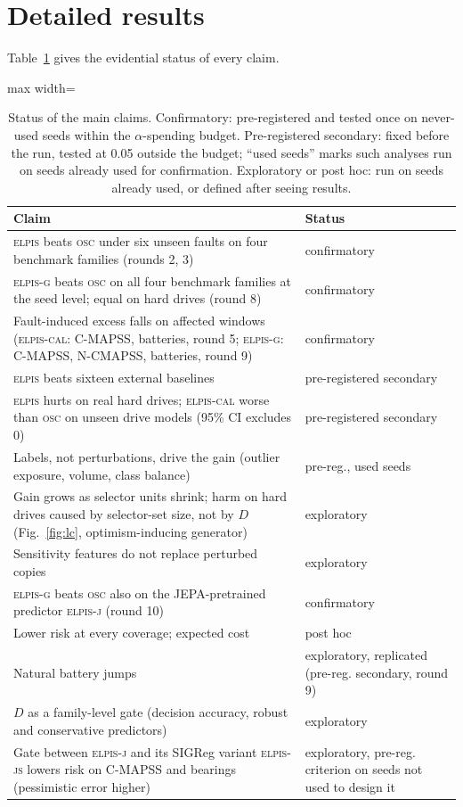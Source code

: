\documentclass{esannV2}
\newcommand{\OSC}{\textsc{osc}}
\newcommand{\RPT}{\textsc{elpis}}
\newcommand{\AUTO}{\textsc{elpis-cal}}
\newcommand{\AUTOD}{\textsc{elpis-g}}
\newcommand{\EJ}{\textsc{elpis-j}}
\newcommand{\EJS}{\textsc{elpis-js}}
\begin{document}
\section{Detailed results}\label{app:detail}
Table~\ref{tab:claims} gives the evidential status of every claim.
\begin{table}[!htbp]
\caption{Status of the main claims. Confirmatory: pre-registered and tested once on never-used seeds within the $\alpha$-spending budget. Pre-registered secondary: fixed before the run, tested at 0.05 outside the budget; ``used seeds'' marks such analyses run on seeds already used for confirmation. Exploratory or post hoc: run on seeds already used, or defined after seeing results.}
\label{tab:claims}
\centering\footnotesize
\setlength{\tabcolsep}{3pt}
\begin{adjustbox}{max width=\textwidth}\begin{tabular}{@{}>{\raggedright\arraybackslash}p{}>{\raggedright\arraybackslash}p{}@{}}
\toprule
Claim & Status\\
\midrule
\RPT{} beats \OSC{} under six unseen faults on four benchmark families (rounds 2, 3) & confirmatory\\
\AUTOD{} beats \OSC{} on all four benchmark families at the seed level; equal on hard drives (round 8) & confirmatory\\
Fault-induced excess falls on affected windows (\AUTO: C-MAPSS, batteries, round 5; \AUTOD: C-MAPSS, N-CMAPSS, batteries, round 9) & confirmatory\\
\RPT{} beats sixteen external baselines & pre-registered secondary\\
\RPT{} hurts on real hard drives; \AUTO{} worse than \OSC{} on unseen drive models (95\% CI excludes 0) & pre-registered secondary\\
Labels, not perturbations, drive the gain (outlier exposure, volume, class balance) & pre-reg., used seeds\\
Gain grows as selector units shrink; harm on hard drives caused by selector-set size, not by $D$ (Fig.~\ref{fig:lc}, optimism-inducing generator) & exploratory\\
Sensitivity features do not replace perturbed copies & exploratory\\
\AUTOD{} beats \OSC{} also on the JEPA-pretrained predictor \EJ{} (round 10) & confirmatory\\
Lower risk at every coverage; expected cost & post hoc\\
Natural battery jumps & exploratory, replicated (pre-reg. secondary, round 9)\\
$D$ as a family-level gate (decision accuracy, robust and conservative predictors) & exploratory\\
Gate between \EJ{} and its SIGReg variant \EJS{} lowers risk on C-MAPSS and bearings (pessimistic error higher) & exploratory, pre-reg. criterion on seeds not used to design it\\
\bottomrule
\end{tabular}\end{adjustbox}
\end{table}
\FloatBarrier
\end{document}
